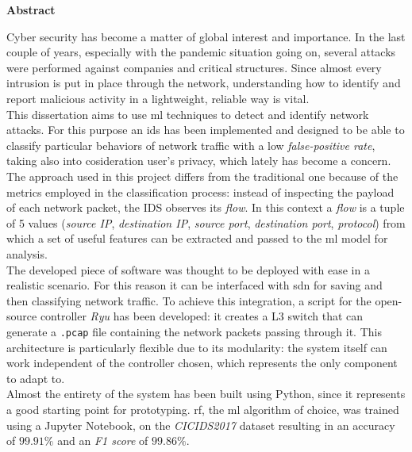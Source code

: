 \thispagestyle{empty}

{\bf\Huge Abstract}

\vspace{1cm}

\hfill\begin{minipage}{\dimexpr\textwidth-0.5cm}
    Cyber security has become a matter of global interest and importance. In the last couple of years, especially with the pandemic situation going on, several attacks were performed against companies and critical structures. Since almost every intrusion is put in place through the network, understanding how to identify and report malicious activity in a lightweight, reliable way is vital. \\

    This dissertation aims to use \gls{ml} techniques to detect and identify network attacks. For this purpose an \gls{ids} has been implemented and designed to be able to classify particular behaviors of network traffic with a low \textit{false-positive rate}, taking also into cosideration user's privacy, which lately has become a concern. \\ The approach used in this project differs from the traditional one because of the metrics employed in the classification process: instead of inspecting the payload of each network packet, the IDS observes its \textit{flow}. In this context a \textit{flow} is a tuple of 5 values (\textit{source IP}, \textit{destination IP}, \textit{source port}, \textit{destination port}, \textit{protocol}) from which a set of useful features can be extracted and passed to the \gls{ml} model for analysis. \\ 
    
    The developed piece of software was thought to be deployed with ease in a realistic scenario. For this reason it can be interfaced with \gls{sdn} for saving and then classifying network traffic. To achieve this integration, a script for the open-source controller \textit{Ryu} has been developed: it creates a L3 switch that can generate a \texttt{.pcap} file containing the network packets passing through it. This architecture is particularly flexible due to its modularity: the system itself can work independent of the controller chosen, which represents the only component to adapt to.\\ Almost the entirety of the system has been built using Python, since it represents a good starting point for prototyping. \gls{rf}, the \gls{ml} algorithm of choice, was trained using a Jupyter Notebook, on the \textit{CICIDS2017} dataset resulting in an accuracy of $99.91\%$ and an \textit{F1 score} of $99.86\%$.
    \end{minipage}

